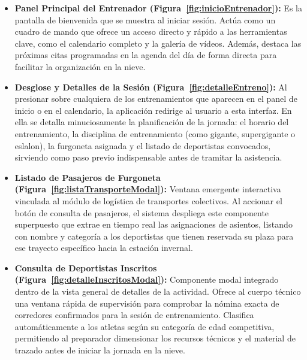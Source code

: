 \newpage

\begin{itemize}
    \item \textbf{Panel Principal del Entrenador (Figura~\ref{fig:inicioEntrenador}):} Es la pantalla de bienvenida que se muestra al iniciar sesión. Actúa como un cuadro de mando que ofrece un acceso directo y rápido a las herramientas clave, como el calendario completo y la galería de vídeos. Además, destaca las próximas citas programadas en la agenda del día de forma directa para facilitar la organización en la nieve.
    
    \item \textbf{Desglose y Detalles de la Sesión (Figura~\ref{fig:detalleEntreno}):} Al presionar sobre cualquiera de los entrenamientos que aparecen en el panel de inicio o en el calendario, la aplicación redirige al usuario a esta interfaz. En ella se detalla minuciosamente la planificación de la jornada: el horario del entrenamiento, la disciplina de entrenamiento (como gigante, supergigante o eslalon), la furgoneta asignada y el listado de deportistas convocados, sirviendo como paso previo indispensable antes de tramitar la asistencia.
    
    \item \textbf{Listado de Pasajeros de Furgoneta (Figura~\ref{fig:listaTransporteModal}):} Ventana emergente interactiva vinculada al módulo de logística de transportes colectivos. Al accionar el botón de consulta de pasajeros, el sistema despliega este componente superpuesto que extrae en tiempo real las asignaciones de asientos, listando con nombre y categoría a los deportistas que tienen reservada su plaza para ese trayecto específico hacia la estación invernal. \par \smallskip

    \item \textbf{Consulta de Deportistas Inscritos (Figura~\ref{fig:detalleInscritosModal}):} Componente modal integrado dentro de la vista general de detalles de la actividad. Ofrece al cuerpo técnico una ventana rápida de supervisión para comprobar la nómina exacta de corredores confirmados para la sesión de entrenamiento. Clasifica automáticamente a los atletas según su categoría de edad competitiva, permitiendo al preparador dimensionar los recursos técnicos y el material de trazado antes de iniciar la jornada en la nieve.
\end{itemize}

